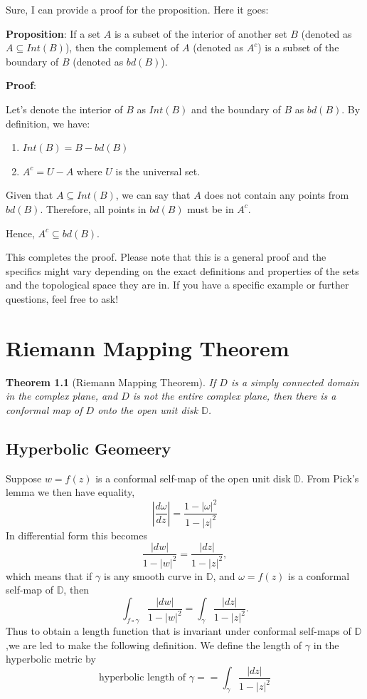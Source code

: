 \documentclass[
]{book}
\providecommand{\tightlist}{%
  \setlength{\itemsep}{0pt}\setlength{\parskip}{0pt}}
\newtheorem{theorem}{Theorem}[chapter]
\theoremstyle{definition}
\theoremstyle{definition}
\theoremstyle{definition}
\theoremstyle{definition}
\theoremstyle{remark}
\begin{document}
Sure, I can provide a proof for the proposition. Here it goes:

\textbf{Proposition}: If a set \(A\) is a subset of the interior of another set \(B\) (denoted as \(A \subseteq Int(B)\)), then the complement of \(A\) (denoted as \(A^c\)) is a subset of the boundary of \(B\) (denoted as \(bd(B)\)).

\textbf{Proof}:

Let's denote the interior of \(B\) as \(Int(B)\) and the boundary of \(B\) as \(bd(B)\). By definition, we have:

\begin{enumerate}
\def\labelenumi{\arabic{enumi}.}
\tightlist
\item
  \(Int(B) = B - bd(B)\)
\item
  \(A^c = U - A\) where \(U\) is the universal set.
\end{enumerate}

Given that \(A \subseteq Int(B)\), we can say that \(A\) does not contain any points from \(bd(B)\). Therefore, all points in \(bd(B)\) must be in \(A^c\).

Hence, \(A^c \subseteq bd(B)\).

This completes the proof. Please note that this is a general proof and the specifics might vary depending on the exact definitions and properties of the sets and the topological space they are in. If you have a specific example or further questions, feel free to ask!

\chapter{Riemann Mapping Theorem}\label{riemann-mapping-theorem}

\begin{theorem}[Riemann Mapping Theorem]
\protect\hypertarget{thm:unnamed-chunk-28}{}\label{thm:unnamed-chunk-28}If \(D\) is a simply connected domain in the complex plane, and \(D\) is not the entire complex plane, then there is a conformal map of \(D\) onto the open unit disk \(\mathbb{D}\).
\end{theorem}

\section{Hyperbolic Geomeery}\label{hyperbolic-geomeery}

Suppose \(w = f(z)\) is a conformal self-map of the open unit disk \(\mathbb{D}\). From Pick's lemma we then have equality,
\[\left|\frac{d\omega}{dz}\right|=\frac{1-|\omega|^2}{1-|z|^2}\]
In differential form this becomes
\[\frac{|dw|}{1-|w|^2} = \frac{|dz|}{1-|z|^2},\]
which means that if \(\gamma\) is any smooth curve in \(\mathbb{D}\), and \(\omega=f(z)\) is a conformal self-map of \(\mathbb{D}\), then
\[\int_{f\circ \gamma}\frac{|dw|}{1-|w|^2} =\int_{\gamma} \frac{|dz|}{1-|z|^2}.\]
Thus to obtain a length function that is invariant under conformal self-maps of \(\mathbb{D}\),we are led to make the following definition. We define the
length of \(\gamma\) in the hyperbolic metric by
\[\text{hyperbolic length of } \gamma = =\int_{\gamma} \frac{|dz|}{1-|z|^2}\]
\end{document}
